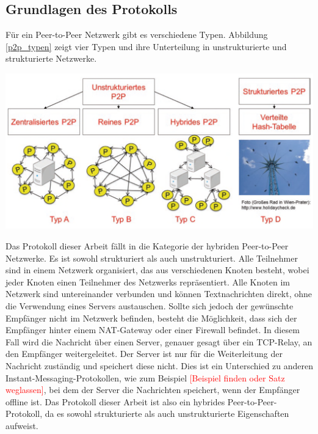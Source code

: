 \subsection{Grundlagen des Protokolls}

Für ein Peer-to-Peer Netzwerk gibt es verschiedene Typen. Abbildung \ref{p2p_typen} zeigt 
vier Typen und ihre Unterteilung in unstrukturierte und strukturierte Netzwerke.

\begin{center}
    \captionsetup{type=figure}
    \includegraphics[width=1\linewidth]{images/peer_to_peer_typen.png}
    \label{p2p_typen}
\end{center}

\noindent Das Protokoll dieser Arbeit fällt in die Kategorie der hybriden Peer-to-Peer Netzwerke.
Es ist sowohl strukturiert als auch unstrukturiert. Alle Teilnehmer sind in einem Netzwerk organisiert,
das aus verschiedenen Knoten besteht, wobei jeder Knoten einen Teilnehmer des Netzwerks repräsentiert.
Alle Knoten im Netzwerk sind untereinander verbunden und können Textnachrichten direkt, ohne die Verwendung 
eines Servers austauschen. Sollte sich jedoch der gewünschte Empfänger nicht im Netzwerk befinden, besteht
die Möglichkeit, dass sich der Empfänger hinter einem NAT-Gateway oder einer Firewall befindet. In diesem
Fall wird die Nachricht über einen Server, genauer gesagt über ein TCP-Relay, an den Empfänger weitergeleitet.
Der Server ist nur für die Weiterleitung der Nachricht zuständig und speichert diese nicht. Dies ist
ein Unterschied zu anderen Instant-Messaging-Protokollen, wie zum Beispiel \textcolor{red}{[Beispiel 
finden oder Satz weglassen]}, bei dem der Server die Nachrichten speichert, wenn der Empfänger offline ist. 
Das Protokoll dieser Arbeit ist also ein hybrides Peer-to-Peer-Protokoll, da es sowohl strukturierte 
als auch unstrukturierte Eigenschaften aufweist.

